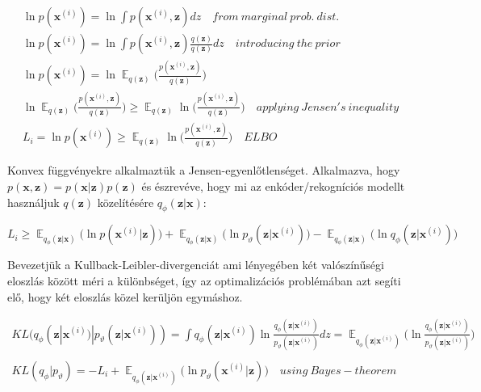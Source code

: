 \documentclass[12pt, english]{article}
\DeclareMathOperator*{\E}{\mathbb{E}}
\begin{document}
\vspace{4mm}

\begin{gather}
    \ln p(\bm{x}^{(i)}) = \ln\int p(\bm{x}^{(i)}, \bm{z})dz \quad from\ marginal\ prob.\ dist.\\
    \ln p(\bm{x}^{(i)}) = \ln\int p(\bm{x}^{(i)}, \bm{z})\frac{q(\bm{z})}{q(\bm{z})}dz \quad introducing\ the\ prior \\
    \ln p(\bm{x}^{(i)}) = \ln \E_{q(\bm{z})} \Big( \frac{p(\bm{x}^{(i)}, \bm{z})}{q(\bm{z})}\Big) \\
    \ln \E_{q(\bm{z})} \Big( \frac{p(\bm{x}^{(i)}, \bm{z})}{q(\bm{z})}\Big) \geq \E_{q(\bm{z})} \ln\Big( \frac{p(\bm{x}^{(i)}, \bm{z})}{q(\bm{z})}\Big) \quad applying\ Jensen's\ inequality \\
    L_{i} = \ln p(\bm{x}^{(i)}) \geq \E_{q(\bm{z})} \ln\Big( \frac{p(\bm{x}^{(i)}, \bm{z})}{q(\bm{z})}\Big) \quad ELBO
\end{gather}

\vspace{4mm}

\par Konvex függvényekre alkalmaztük a Jensen-egyenlőtlenséget. Alkalmazva, hogy $p(\bm{x}, \bm{z}) = p(\bm{x} | \bm{z})p(\bm{z})$ és észrevéve, hogy mi az enkóder/rekogníciós modellt használjuk $q(\bm{z})$ közelítésére $q_{\phi}(\bm{z} | \bm{x})$:

\vspace{4mm}

\begin{equation}
    L_{i} \geq \E_{q_{\phi}(\bm{z} | \bm{x})} \Big( \ln p(\bm{x}^{(i)} | \bm{z}) \Big) + \E_{q_{\phi}(\bm{z} | \bm{x})} \Big( \ln p_{\vartheta}(\bm{z} | \bm{x}^{(i)}) \Big) - \E_{q_{\phi}(\bm{z} | \bm{x})} \Big( \ln q_{\phi}(\bm{z} | \bm{x}^{(i)}) \Big)
\end{equation}

\vspace{4mm}

\par Bevezetjük a Kullback-Leibler-divergenciát ami lényegében két valószínűségi eloszlás között méri a különbséget, így az optimalizációs problémában azt segíti elő, hogy két eloszlás közel kerüljön egymáshoz.

\vspace{4mm}

\begin{gather*}
    KL(q_{\phi}(\bm{z} | \bm{x}^{(i)}) | p_{\vartheta}(\bm{z} | \bm{x}^{(i)})) = \int q_{\phi}(\bm{z} | \bm{x}^{(i)})\ln \frac{q_{\phi}(\bm{z} | \bm{x}^{(i)})}{p_{\vartheta}(\bm{z} | \bm{x}^{(i)})}dz = \E_{q_{\phi}(\bm{z} | \bm{x}^{(i)})} \Big( \ln \frac{q_{\phi}(\bm{z} | \bm{x}^{(i)})}{p_{\vartheta}(\bm{z}|\bm{x}^{(i)})}  \Big) \\ \\
    KL(q_{\phi} | p_{\vartheta}) = -L_{i} + \E_{q_{\phi}(\bm{z} | \bm{x}^{(i)})} \Big( \ln p_{\vartheta}(\bm{x}^{(i)} | \bm{z}) \Big) \quad using\ Bayes-theorem
\end{gather*}
\end{document}
